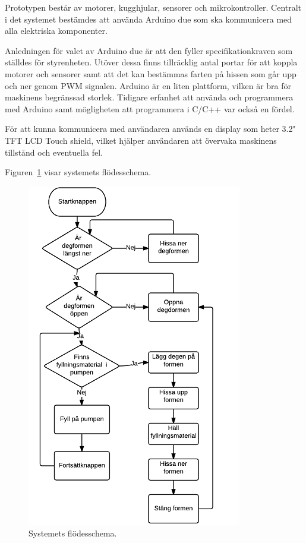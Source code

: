 Prototypen består av motorer, kugghjular, sensorer och mikrokontroller. Centralt i det systemet bestämdes att använda Arduino due som ska kommunicera med alla elektriska komponenter.

Anledningen för valet av Arduino due är att den fyller specifikationkraven som ställdes för styrenheten. Utöver dessa finns tillräcklig antal portar för att koppla motorer och sensorer samt att det kan bestämmas farten på hissen som går upp och ner genom PWM signalen. Arduino är en liten plattform, vilken är bra för maskinens begränssad storlek. Tidigare erfanhet att använda och programmera med Arduino samt mögligheten att programmera i C/C++ var också en fördel.

För att kunna kommunicera med användaren används en display som heter 3.2" TFT LCD Touch shield, vilket hjälper användaren att övervaka maskinens tillstånd och eventuella fel.

Figuren~\ref{flodesschma} visar systemets flödesschema.

\begin{figure}[ht]
	\begin{center}
		\includegraphics[scale=1.7]{images/Flowchart.png}
		\caption{Systemets flödesschema.}
		\label{flodesschma}	
	\end{center}
\end{figure}